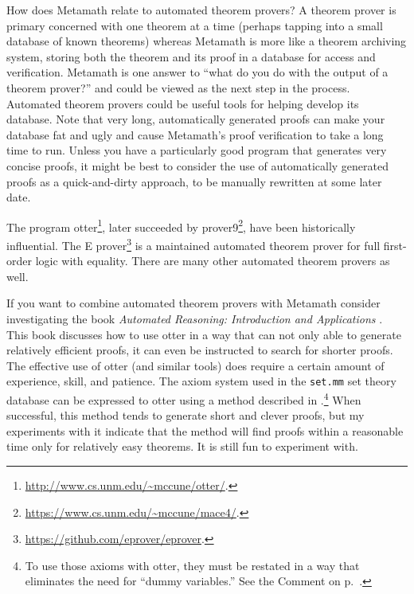How does Metamath relate to automated theorem provers?  A
theorem prover is primary concerned with one theorem at a time (perhaps
tapping into a small database of known theorems) whereas Metamath is more like
a theorem archiving system, storing both the theorem and its proof in a
database for access and verification.  Metamath is one answer to ``what do you
do with the output of a theorem prover?''  and could be viewed as the
next step in the process.  Automated theorem provers could be useful tools for
helping develop its database.
Note that very long, automatically
generated proofs can make your database fat and ugly and cause Metamath's proof
verification to take a long time to run.  Unless you have a particularly good
program that generates very concise proofs, it might be best to consider the
use of automatically generated proofs as a quick-and-dirty approach, to be
manually rewritten at some later date.

The program {\sc otter}\footnote{\url{http://www.cs.unm.edu/\~mccune/otter/}.}, later succeeded by
prover9\footnote{\url{https://www.cs.unm.edu/~mccune/mace4/}.},
have been historically influential.
The E prover\footnote{\url{https://github.com/eprover/eprover}.}
is a maintained automated theorem prover
for full first-order logic with equality.
There are many other automated theorem provers as well.

If you want to combine automated theorem provers with Metamath
consider investigating
the book {\em Automated Reasoning:  Introduction and Applications}
\cite{Wos}.  This book discusses
how to use {\sc otter} in a way that can
not only able to generate
relatively efficient proofs, it can even be instructed to search for
shorter proofs.  The effective use of {\sc otter} (and similar tools)
does require a certain
amount of experience, skill, and patience.  The axiom system used in the
\texttt{set.mm} set theory
database can be expressed to {\sc otter} using a method described in
\cite{Megill}.\footnote{To use those axioms with
{\sc otter}, they must be restated in a way that eliminates the need for
``dummy variables.'' See the Comment
on p.~\pageref{nodd}.} When successful, this method tends to generate
short and clever proofs, but my experiments with it indicate that the
method will find proofs within a reasonable time only for relatively
easy theorems.  It is still fun to experiment with.

